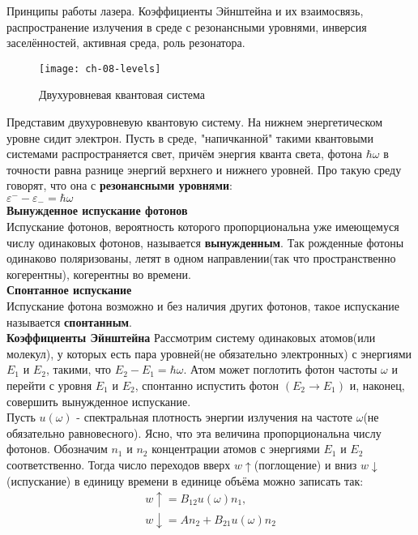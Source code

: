 \documentclass[__main__.tex]{subfiles}
\begin{document}
Принципы работы лазера. Коэффициенты Эйнштейна и их взаимосвязь, распространение излучения в среде с резонансными уровнями, инверсия заселённостей, активная среда, роль резонатора.\\ 

\begin{wrapfigure}{l!}{.3\linewidth}
	\texttt{[image: ch-08-levels]}
	\caption{Двухуровневая квантовая система}
	\label{ch-08-levels}
\end{wrapfigure}
Представим двухуровневую квантовую систему. На нижнем энергетическом уровне сидит электрон. Пусть в среде, "напичканной" такими квантовыми системами распространяется свет, причём энергия кванта света, фотона $\hbar\omega$ в точности равна разнице энергий верхнего и нижнего уровней. Про такую среду говорят, что она с \textbf{резонансными уровнями}:\\
$\varepsilon^{-} - \varepsilon_{-} = \hbar\omega$\\
\textbf{Вынужденное испускание фотонов}\\
Испускание фотонов, вероятность которого пропорциональна уже имеющемуся числу одинаковых фотонов, называется \textbf{вынужденным}. Так рожденные фотоны одинаково поляризованы, летят в одном направлении(так что пространственно когерентны), когерентны во времени.\\
\textbf{Спонтанное испускание}\\
Испускание фотона возможно и без наличия других фотонов, такое испускание называется \textbf{спонтанным}.\\
\textbf{Коэффициенты Эйнштейна}
Рассмотрим систему одинаковых атомов(или молекул), у которых есть пара уровней(не обязательно электронных) с энергиями $E_1$ и $E_2$, такими, что $E_2 - E_1 = \hbar\omega$.
Атом может поглотить фотон частоты $\omega$ и перейти с уровня $E_1$ и $E_2$, спонтанно испустить фотон $(E_2 \rightarrow E_1)$ и, наконец, совершить вынужденное испускание.\\
Пусть $u(\omega)$ - спектральная плотность энергии излучения на частоте $\omega$(не обязательно равновесного). Ясно, что эта величина пропорциональна числу фотонов. Обозначим $n_1$ и $n_2$ концентрации атомов с энергиями $E_1$ и $E_2$ соответственно. Тогда число переходов вверх $w\uparrow$(поглощение) и вниз $w\downarrow$(испускание) в единицу времени в единице объёма можно записать так:\\
\begin{gather}
	w\uparrow = B_{12}u(\omega)n_1,\\
	w\downarrow = An_{2} + B_{21}u(\omega)n_2
\end{gather}
\end{document}
